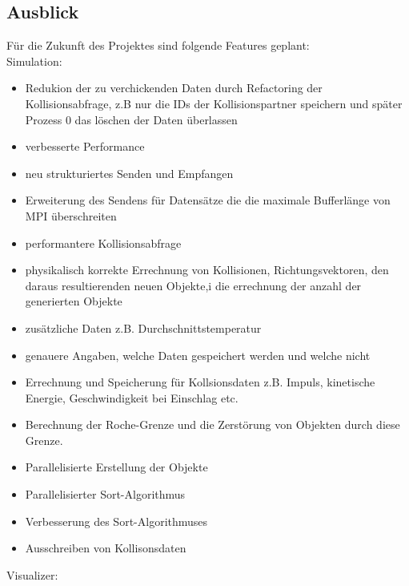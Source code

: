 \subsection{Ausblick}
Für die Zukunft des Projektes sind folgende Features geplant:
\\
Simulation:
\begin{itemize}
    \item Redukion der zu verchickenden Daten durch Refactoring der Kollisionsabfrage, z.B nur die IDs der Kollisionspartner speichern und später Prozess 0 das löschen der Daten überlassen
    \item verbesserte Performance
    \item neu strukturiertes Senden und Empfangen
    \item Erweiterung des Sendens für Datensätze die die maximale Bufferlänge von MPI überschreiten
    \item performantere Kollisionsabfrage
    \item physikalisch korrekte Errechnung von Kollisionen, Richtungsvektoren, den daraus resultierenden neuen Objekte,i die errechnung der anzahl der generierten Objekte    
    \item zusätzliche Daten z.B. Durchschnittstemperatur
    \item genauere Angaben, welche Daten gespeichert werden und welche nicht
    \item Errechnung und Speicherung für Kollsionsdaten z.B. Impuls, kinetische Energie, Geschwindigkeit bei Einschlag etc.
    \item Berechnung der Roche-Grenze und die Zerstörung von Objekten durch diese Grenze.
    \item Parallelisierte Erstellung der Objekte
    \item Parallelisierter Sort-Algorithmus
    \item Verbesserung des Sort-Algorithmuses
    \item Ausschreiben von Kollisonsdaten

\end{itemize}
Visualizer:
